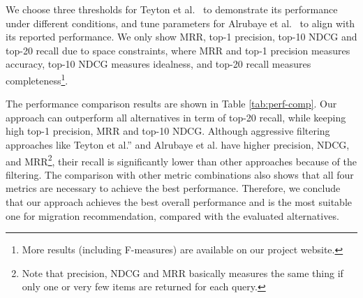 \documentclass[conference, 10pt]{IEEEtran}
\begin{document}
We choose three thresholds for Teyton et al.~\cite{2012WCRE-Teyton-Mining} to demonstrate its performance under different conditions, and tune parameters for Alrubaye et al.~\cite{2019ICSME-Alrubaye-MigrationMiner} to align with its reported performance.
We only show MRR, top-1 precision, top-10 NDCG and top-20 recall due to space constraints, where MRR and top-1 precision measures accuracy, top-10 NDCG measures idealness, and top-20 recall measures completeness\footnote{More results (including F-measures) are available on our project website.}.

The performance comparison results are shown in Table \ref{tab:perf-comp}. 
Our approach can outperform all alternatives in term of top-20 recall, while keeping high top-1 precision, MRR and top-10 NDCG. 
Although aggressive filtering approaches like Teyton et al.'' and Alrubaye et al. have higher precision, NDCG, and MRR\footnote{Note that precision, NDCG and MRR basically measures the same thing if only one or very few items are returned for each query.}, their recall is significantly lower than other approaches because of the filtering. 
The comparison with other metric combinations also shows that all four metrics are necessary to achieve the best performance. 
Therefore, we conclude that our approach achieves the best overall performance and is the most suitable one for migration recommendation, compared with the evaluated alternatives.
\end{document}
